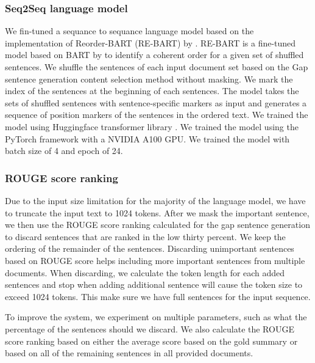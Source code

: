     

\subsubsection{Seq2Seq language model}

We fin-tuned a sequance to sequance language model based on the implementation of Reorder-BART (RE-BART) by \citeauthor{rebart}.  RE-BART is a fine-tuned model based on BART by to identify a coherent order for a given set of shuffled sentences. We shuffle the sentences of each input document set based on the Gap sentence generation content selection method without masking. We mark the index of the sentences at the beginning of each sentences. The model takes the sets of shuffled sentences with sentence-specific markers as input and generates a sequence of position markers of the sentences in the ordered text. We trained the model using Huggingface transformer library \citet{transformers}. We trained the model using the PyTorch framework with a NVIDIA A100 GPU. We trained the model with batch size of 4 and epoch of 24. 

\subsubsection{ROUGE score ranking}
Due to the input size limitation for the majority of the language model, we have to truncate the input text to 1024 tokens. After we mask the important sentence, we then use the ROUGE score ranking calculated for the gap sentence generation to discard sentences that are ranked in the low thirty percent. We keep the ordering of the remainder of the sentences. Discarding unimportant sentences based on ROUGE score helps including more important sentences from multiple documents. When discarding, we calculate the token length for each added sentences and stop when adding additional sentence will cause the token size to exceed 1024 tokens. This make sure we have full sentences for the input sequence.

To improve the system, we experiment on multiple parameters, such as what the percentage of the sentences should we discard. We also calculate the ROUGE score ranking based on either the average score based on the gold summary or based on all of the remaining sentences in all provided documents. 